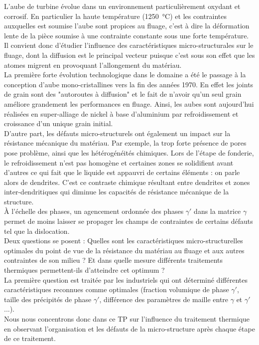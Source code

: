 L'aube de turbine évolue dans un environnement particulièrement oxydant et corrosif. 
En particulier la haute température (\SI{1250}{\celsius}) et les contraintes auxquelles est soumise 
l'aube sont propices au fluage, c'est à dire la déformation lente de la pièce soumise à une contrainte constante sous une forte température. Il convient donc d'étudier l'influence des 
caractéristiques micro-structurales sur le fluage, dont la diffusion est le principal 
vecteur puisque c'est sous son effet que les atomes migrent en provoquant l'allongement du matériau.\\


La première forte évolution technologique dans le domaine a été le passage à la conception 
d'aube mono-cristallines vers la fin des années 1970. En effet les joints de grain sont des
"autoroutes à diffusion" et le fait de n'avoir qu'un seul grain améliore grandement les 
performances en fluage. Ainsi, les aubes sont aujourd'hui réalisées en super-alliage de 
nickel à base d'aluminium par refroidissement et croissance d'un unique grain initial.\\


D'autre part, les défauts micro-structurels ont également un impact sur la résistance 
mécanique du matériau. Par exemple, la trop forte présence de pores pose problème, 
ainsi que les hétérogénéités chimiques. Lors de l'étape de fonderie, le refroidissement
n'est pas homogène et certaines zones se solidifient avant d'autres ce qui fait 
que le liquide est appauvri de certains éléments : on parle alors de dendrites. 
C'est ce contraste chimique résultant entre dendrites et zones inter-dendritiques
qui diminue les capacités de résistance mécanique de la structure.\\


À l'échelle des phases, un agencement ordonnée des phases $\gamma'$ dans la 
matrice $\gamma$ permet de moins laisser se propager les champs de contraintes de 
certains défauts tel que la dislocation.\\


Deux questions se posent : Quelles sont les caractéristiques micro-structurelles 
optimales du point de vue de la résistance du matériau au fluage et aux autres 
contraintes de son milieu ? Et dans quelle mesure différents traitements thermiques 
permettent-ils d'atteindre cet optimum ?\\


La première question est traitée par les industriels qui ont déterminé différentes 
caractéristiques reconnues comme optimales (fraction volumique de phase $\gamma'$, 
taille des précipités de phase $\gamma'$, différence des paramètres de maille 
entre $\gamma$ et $\gamma'$...).\\


Nous nous concentrons donc dans ce TP sur l'influence du traitement thermique en observant l'organisation et les défauts de la micro-structure après chaque étape de ce traitement.\\

